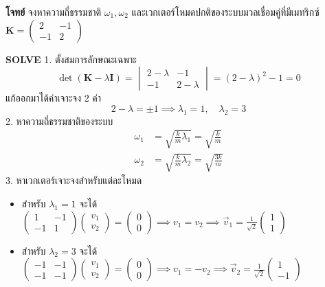\begin{mathexample}
\textbf{โจทย์} จงหาความถี่ธรรมชาติ $\omega_1, \omega_2$ และเวกเตอร์โหมดปกติของระบบมวลเชื่อมคู่ที่มีเมทริกซ์ $\mathbf{K} = \begin{pmatrix} 2 & -1 \\ -1 & 2 \end{pmatrix}$

\vspace{0.2cm}
\textbf{SOLVE}
1. ตั้งสมการลักษณะเฉพาะ
\begin{equation}
\det(\mathbf{K} - \lambda \mathbf{I}) = \begin{vmatrix} 2 - \lambda & -1 \\ -1 & 2 - \lambda \end{vmatrix} = (2 - \lambda)^2 - 1 = 0
\end{equation}
แก้ออกมาได้ค่าเจาะจง 2 ค่า
\begin{equation}
2 - \lambda = \pm 1 \implies \lambda_1 = 1, \quad \lambda_2 = 3
\end{equation}
2. หาความถี่ธรรมชาติของระบบ
\begin{align}
\omega_1 &= \sqrt{\frac{k}{m}\lambda_1} = \sqrt{\frac{k}{m}} \\
\omega_2 &= \sqrt{\frac{k}{m}\lambda_2} = \sqrt{\frac{3k}{m}}
\end{align}
3. หาเวกเตอร์เจาะจงสำหรับแต่ละโหมด
\begin{itemize}
    \item สำหรับ $\lambda_1 = 1$ จะได้ $\begin{pmatrix} 1 & -1 \\ -1 & 1 \end{pmatrix}\begin{pmatrix} v_1 \\ v_2 \end{pmatrix} = \begin{pmatrix} 0 \\ 0 \end{pmatrix} \implies v_1 = v_2 \implies \vec{v}_1 = \frac{1}{\sqrt{2}}\begin{pmatrix} 1 \\ 1 \end{pmatrix}$
    \item สำหรับ $\lambda_2 = 3$ จะได้ $\begin{pmatrix} -1 & -1 \\ -1 & -1 \end{pmatrix}\begin{pmatrix} v_1 \\ v_2 \end{pmatrix} = \begin{pmatrix} 0 \\ 0 \end{pmatrix} \implies v_1 = -v_2 \implies \vec{v}_2 = \frac{1}{\sqrt{2}}\begin{pmatrix} 1 \\ -1 \end{pmatrix}$
\end{itemize}


\end{mathexample}
